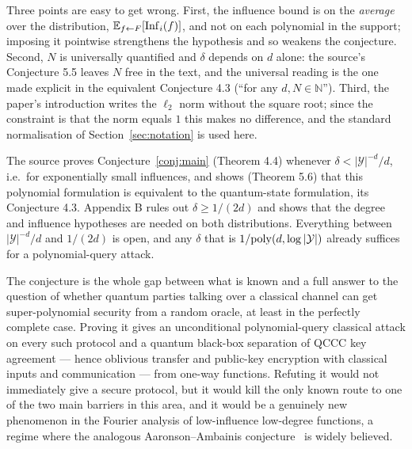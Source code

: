 \documentclass{aicr-conjecture}
\newcommand{\Yc}{\mathcal{Y}}
\begin{document}
\begin{remark}\label{rem:reading}
Three points are easy to get wrong. First, the influence bound is on the
\emph{average} over the distribution,
$\mathbb{E}_{f \leftarrow F}[\operatorname{Inf}_i(f)]$, and not on each
polynomial in the support; imposing it pointwise strengthens the
hypothesis and so weakens the conjecture. Second, $N$ is universally
quantified and $\delta$ depends on $d$ alone: the source's Conjecture
5.5 leaves $N$ free in the text, and the universal reading is the one
made explicit in the equivalent Conjecture 4.3 (``for any
$d, N \in \mathbb{N}$''). Third, the paper's introduction writes the
$\ell_2$ norm without the square root; since the constraint is that the
norm equals $1$ this makes no difference, and the standard normalisation
of Section~\ref{sec:notation} is used here.
\end{remark}

\begin{remark}\label{rem:window}
The source proves Conjecture~\ref{conj:main} (Theorem 4.4) whenever
$\delta < |\Yc|^{-d}/d$, i.e.\ for exponentially small influences, and
shows (Theorem 5.6) that this polynomial formulation is equivalent to
the quantum-state formulation, its Conjecture 4.3. Appendix B rules out
$\delta \ge 1/(2d)$ and shows that the degree and influence hypotheses
are needed on both distributions. Everything between $|\Yc|^{-d}/d$ and
$1/(2d)$ is open, and any $\delta$ that is $1/\poly(d,\log|\Yc|)$
already suffices for a polynomial-query attack.
\end{remark}

\begin{remark}\label{rem:consequence}
The conjecture is the whole gap between what is known and a full answer
to the question of whether quantum parties talking over a classical
channel can get super-polynomial security from a random oracle, at least
in the perfectly complete case. Proving it gives an unconditional
polynomial-query classical attack on every such protocol and a quantum
black-box separation of QCCC key agreement --- hence oblivious transfer
and public-key encryption with classical inputs and communication ---
from one-way functions. Refuting it would not immediately give a secure
protocol, but it would kill the only known route to one of the two main
barriers in this area, and it would be a genuinely new phenomenon in the
Fourier analysis of low-influence low-degree functions, a regime where
the analogous Aaronson--Ambainis conjecture~\cite{AA14} is widely
believed.
\end{remark}
\end{document}
